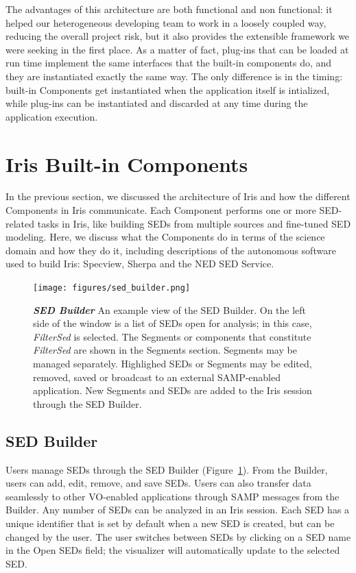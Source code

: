 \documentclass[final,5p]{elsarticle}
\begin{document}
The advantages of this architecture are both functional and non functional: it helped our heterogeneous developing team to work in a loosely coupled way, reducing the overall project risk, but it also provides the extensible framework we were seeking in the first place. As a matter of fact, plug-ins that can be loaded at run time implement the same interfaces that the built-in components do, and they are instantiated exactly the same way. The only difference is in the timing: built-in Components get instantiated when the application itself is intialized, while plug-ins can be instantiated and discarded at any time during the application execution.

\section{Iris Built-in Components}
\label{sec:components}

In the previous section, we discussed the architecture of Iris and how the different Components in Iris communicate. Each Component performs one or more SED-related tasks in Iris, like building SEDs from multiple sources and fine-tuned SED modeling.  Here, we discuss what the Components do in terms of the science domain and how they do it, including descriptions of the autonomous software used to build Iris: Specview, Sherpa and the NED SED Service.

\begin{figure}
\begin{center}
\texttt{[image: figures/sed\_builder.png]}
\caption{\textit{\textbf{SED Builder}} An example view of the SED Builder. On the left side of the window is a list of SEDs open for analysis; in this case, \textit{FilterSed} is selected. The Segments or components that constitute \textit{FilterSed} are shown in the Segments section. Segments may be managed separately. Highlighed SEDs or Segments may be edited, removed, saved or broadcast to an external SAMP-enabled application. New Segments and SEDs are added to the Iris session through the SED Builder. }
\label{fig:sed_builder}
\end{center}
\end{figure}

\subsection{SED Builder}

Users manage SEDs through the SED Builder (Figure~\ref{fig:sed_builder}). From the Builder, users can add, edit, remove, and save SEDs. Users can also transfer data seamlessly to other VO-enabled applications through SAMP messages from the Builder. Any number of SEDs can be analyzed in an Iris session. Each SED has a unique identifier that is set by default when a new SED is created, but can be changed by the user. The user switches between SEDs by clicking on a SED name in the Open SEDs field; the visualizer will automatically update to the selected SED.
\end{document}
